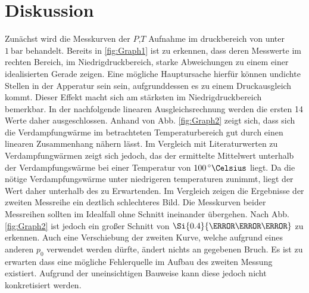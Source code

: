 
\section{Diskussion}
\label{sec:Diskussion}
Zunächst wird die Messkurven der $P$,$T$ Aufnahme im druckbereich von unter $\SI{1}{\bar}$
 behandelt. Bereits in \ref{fig:Graph1} ist zu erkennen, dass deren Messwerte im
  rechten Bereich, im Niedrigdruckbereich, starke Abweichungen zu einem einer
  idealisierten Gerade zeigen. Eine mögliche Hauptursache hierfür können
  undichte Stellen in der Apperatur sein sein, aufgrunddessen es zu einem
   Druckausgleich kommt. Dieser Effekt macht sich am stärksten im
   Niedrigdruckbereich bemerkbar. In der nachfolgende linearen Ausgleichsrechnung
    werden die ersten 14 Werte daher ausgeschlossen. Anhand von Abb.
     \ref{fig:Graph2} zeigt sich, dass sich die Verdampfungwärme im betrachteten
      Temperaturbereich gut durch einen linearen Zusammenhang nähern lässt. Im
      Vergleich mit Literaturwerten zu Verdampfungwärmen zeigt sich jedoch, das der
      ermittelte Mittelwert unterhalb der Verdampfungswärme bei einer
       Temperatur von $\SI{100}{\degree\Celsius}$ liegt. Da die nötige
       Verdampfungswärme unter niedrigeren temperaturen zunimmt, liegt der Wert
        daher unterhalb des zu Erwartenden. Im Vergleich zeigen die Ergebnisse
         der zweiten Messreihe ein deztlich schlechteres Bild. Die Messkurven beider
          Messreihen sollten im Idealfall ohne Schnitt ineinander übergehen.
           Nach Abb. \ref{fig:Graph2} ist jedoch ein großer Schnitt von
           $\Si{0.4}{\per\milli\kelvin}$ zu erkennen. Auch eine Verschiebung der
            zweiten Kurve, welche aufgrund eines anderen $p_0$ verwendet werden dürfte,
             ändert nichts an gegebenen Bruch. Es ist zu erwarten dass eine mögliche
              Fehlerquelle im Aufbau des zweiten Messung existiert. Aufgrund der
               uneinsichtigen Bauweise kann diese jedoch nicht konkretisiert werden.
